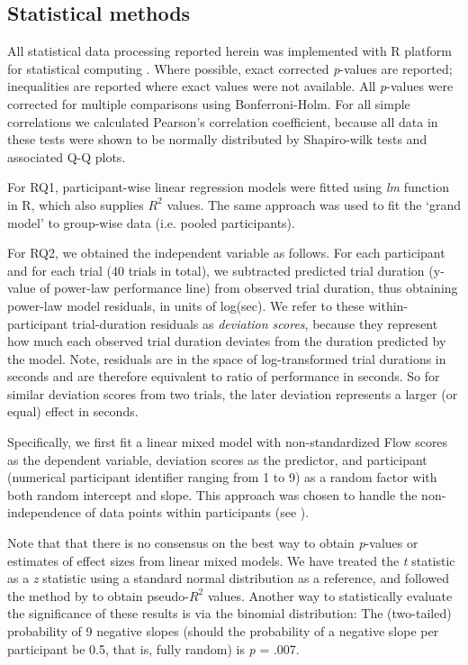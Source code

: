 \documentclass{frontierstyle/frontiersSCNS}
\begin{document}
\subsection{Statistical methods}
All statistical data processing reported herein was implemented with {\sf R} platform for statistical computing \citep{R2014}. Where possible, exact corrected {\it p}-values are reported; inequalities are reported where exact values were not available. All {\it p}-values were corrected for multiple comparisons using Bonferroni-Holm. For all simple correlations we calculated Pearson's correlation coefficient, because all data in these tests were shown to be normally distributed by Shapiro-wilk tests and associated Q-Q plots.

For {\sf RQ1}, participant-wise linear regression models were fitted using {\it lm} function in {\sf R}, which also supplies $R^2$ values. The same approach was used to fit the `grand model' to group-wise data (i.e. pooled participants).

For {\sf RQ2}, we obtained the independent variable as follows. For each participant and for each trial (40 trials in total), we subtracted predicted trial duration (y-value of power-law performance line) from observed trial duration, thus obtaining power-law model residuals, in units of log(sec). We refer to these within-participant trial-duration residuals as {\it deviation scores}, because they represent how much each observed trial duration deviates from the duration predicted by the model. Note, residuals are in the space of log-transformed trial durations in seconds and are therefore equivalent to ratio of performance in seconds. So for similar deviation scores from two trials, the later deviation represents a larger (or equal) effect in seconds.

Specifically, we first fit a linear mixed model with non-standardized Flow scores as the dependent variable, deviation scores as the predictor, and participant (numerical participant identifier ranging from 1 to 9) as a random factor with both random intercept and slope. This approach was chosen to handle the non-independence of data points within participants (see \cite{Bates2015_lme4}).

Note that that there is no consensus on the best way to obtain {\it p}-values or estimates of effect sizes from linear mixed models. We have treated the {\it t} statistic as a {\it z} statistic using a standard normal distribution as a reference, and followed the method by \cite{nakagawa2013general} to obtain pseudo-$R^2$ values. Another way to statistically evaluate the significance of these results is via the binomial distribution: The (two-tailed) probability of 9 negative slopes (should the probability of a negative slope per participant be 0.5, that is, fully random) is {\it p} = .007.
\end{document}
